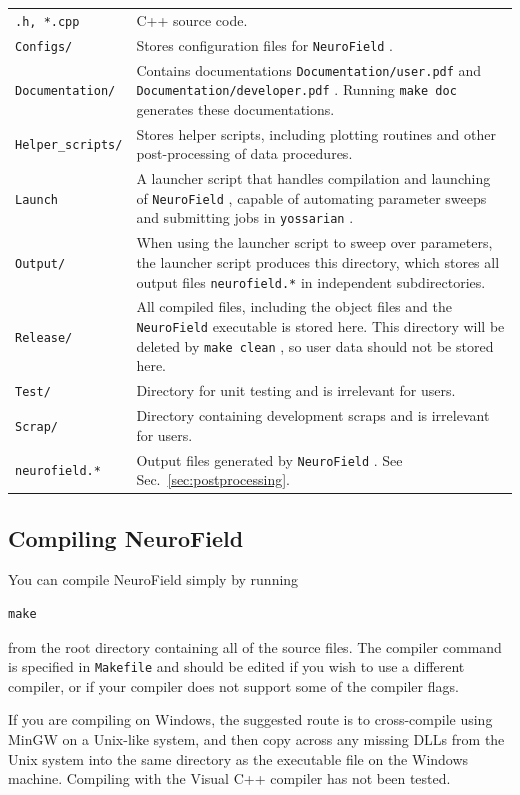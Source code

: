 \documentclass[12pt,a4paper]{article}
\newcommand{\type}[1]{ {\small\small\tt #1} }
\newcommand{\NF}[0]{ \type{NeuroField}}
\begin{document}
\begin{tabular}{l p{14.4cm}}
\type{*.h, *.cpp}& C++ source code.\\
\type{Configs/}& Stores configuration files for \NF.\\
\type{Documentation/}& Contains documentations \type{Documentation/user.pdf} and \type{Documentation/developer.pdf}. Running \type{make doc} generates these documentations.\\
\type{Helper\_scripts/}& Stores helper scripts, including plotting routines and other post-processing of data procedures.\\
\type{Launch}& A launcher script that handles compilation and launching of \NF, capable of automating parameter sweeps and submitting jobs in \type{yossarian}.\\
\type{Output/}& When using the launcher script to sweep over parameters, the launcher script produces this directory, which stores all output files \type{neurofield.*} in independent subdirectories.\\
\type{Release/}& All compiled files, including the object files and the \NF executable is stored here. This directory will be deleted by \type{make clean}, so user data should not be stored here.\\
\type{Test/}& Directory for unit testing and is irrelevant for users.\\
\type{Scrap/}& Directory containing development scraps and is irrelevant for users.\\
\type{neurofield.*}& Output files generated by \NF. See Sec.~\ref{sec:postprocessing}.
\end{tabular}

\subsection{Compiling NeuroField} %
\label{sec:compiling}
You can compile NeuroField simply by running 

\begin{lstlisting}
make
\end{lstlisting}

from the root directory containing all of the source files. The compiler command is specified in \type{Makefile} and should be edited if you wish to use a different compiler, or if your compiler does not support some of the compiler flags.

If you are compiling on Windows, the suggested route is to cross-compile using MinGW on a Unix-like system, and then copy across any missing DLLs from the Unix system into the same directory as the executable file on the Windows machine. Compiling with the Visual C++ compiler has not been tested.
\end{document}
